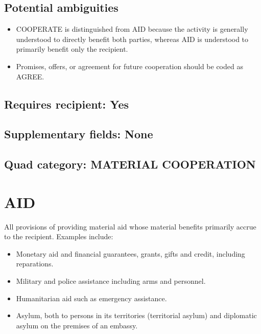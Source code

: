 \documentclass[11pt]{report}
\newcommand{\plcat}[1]{\textsf{#1}}
\begin{document}
\subsection{Potential ambiguities}

\begin{itemize}
\item \plcat{COOPERATE} is distinguished from \plcat{AID} because the activity is generally understood to directly benefit both parties, whereas  \plcat{AID} is understood to primarily benefit only the recipient.
\item Promises, offers, or agreement for future cooperation should be coded as \plcat{AGREE}.
\end{itemize}

\subsection{Requires recipient: Yes}

\subsection{Supplementary fields: None}

\subsection{Quad category: MATERIAL COOPERATION}


\newpage

\section{AID}

All provisions of providing material aid whose material benefits primarily accrue to the recipient. Examples include:

\begin{itemize}

\item Monetary aid and financial guarantees, grants, gifts and credit, including reparations.

\item Military and police assistance including arms and personnel.

\item Humanitarian aid such as emergency assistance.

\item Asylum, both to persons in its territories (territorial asylum) and diplomatic asylum on the premises of an embassy.

\end{itemize}
\end{document}
